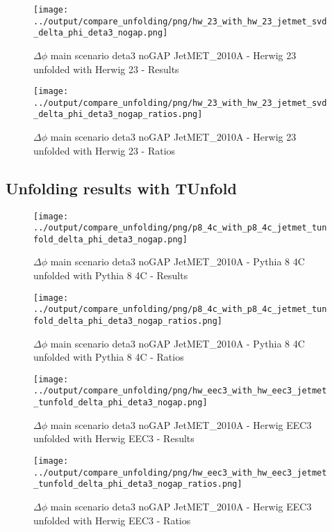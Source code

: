 \documentclass[11pt]{book}
\begin{document}
\begin{figure}[ht]
\centering
\texttt{[image: ../output/compare\_unfolding/png/hw\_23\_with\_hw\_23\_jetmet\_svd\_delta\_phi\_deta3\_nogap.png]}
\caption{$\Delta\phi$ main scenario deta3 noGAP JetMET\_2010A - Herwig 23 unfolded with Herwig 23 - Results}
\label{hw_23_hw_23_jetmet_svd_delta_phi_deta3_nogap_a}
\end{figure}

\begin{figure}[ht]
\centering
\texttt{[image: ../output/compare\_unfolding/png/hw\_23\_with\_hw\_23\_jetmet\_svd\_delta\_phi\_deta3\_nogap\_ratios.png]}
\caption{$\Delta\phi$ main scenario deta3 noGAP JetMET\_2010A - Herwig 23 unfolded with Herwig 23 - Ratios}
\label{hw_23_hw_23_jetmet_svd_delta_phi_deta3_nogap_b}
\end{figure}


\clearpage
\subsection{Unfolding results with TUnfold}

\begin{figure}[ht]
\centering
\texttt{[image: ../output/compare\_unfolding/png/p8\_4c\_with\_p8\_4c\_jetmet\_tunfold\_delta\_phi\_deta3\_nogap.png]}
\caption{$\Delta\phi$ main scenario deta3 noGAP JetMET\_2010A - Pythia 8 4C unfolded with Pythia 8 4C - Results}
\label{p8_p8_jetmet_tunfold_delta_phi_deta3_nogap_a}
\end{figure}

\begin{figure}[ht]
\centering
\texttt{[image: ../output/compare\_unfolding/png/p8\_4c\_with\_p8\_4c\_jetmet\_tunfold\_delta\_phi\_deta3\_nogap\_ratios.png]}
\caption{$\Delta\phi$ main scenario deta3 noGAP JetMET\_2010A - Pythia 8 4C unfolded with Pythia 8 4C - Ratios}
\label{p8_p8_jetmet_tunfold_delta_phi_deta3_nogap_b}
\end{figure}

\begin{figure}[ht]
\centering
\texttt{[image: ../output/compare\_unfolding/png/hw\_eec3\_with\_hw\_eec3\_jetmet\_tunfold\_delta\_phi\_deta3\_nogap.png]}
\caption{$\Delta\phi$ main scenario deta3 noGAP JetMET\_2010A - Herwig EEC3 unfolded with Herwig EEC3 - Results}
\label{hw_eec3_hw_eec3_jetmet_tunfold_delta_phi_deta3_nogap_a}
\end{figure}

\begin{figure}[ht]
\centering
\texttt{[image: ../output/compare\_unfolding/png/hw\_eec3\_with\_hw\_eec3\_jetmet\_tunfold\_delta\_phi\_deta3\_nogap\_ratios.png]}
\caption{$\Delta\phi$ main scenario deta3 noGAP JetMET\_2010A - Herwig EEC3 unfolded with Herwig EEC3 - Ratios}
\label{hw_eec3_hw_eec3_jetmet_tunfold_delta_phi_deta3_nogap_b}
\end{figure}
\end{document}
